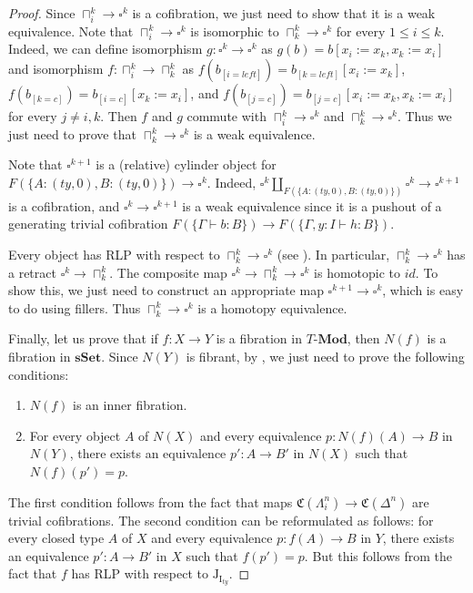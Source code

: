 \documentclass[reqno]{amsart}
\theoremstyle{definition}
\theoremstyle{remark}
\newcommand{\repl}{:=}
\newcommand{\cat}[1]{\mathbf{#1}}
\newcommand{\Mod}[1]{#1\text{-}\cat{Mod}}
\newcommand{\sSet}{\cat{sSet}}
\newcommand{\I}{\mathrm{I}}
\newcommand{\J}{\mathrm{J}}
\numberwithin{figure}{section}
\begin{document}
\begin{proof}
Since $\sqcap^k_i \to \square^k$ is a cofibration, we just need to show that it is a weak equivalence.
Note that $\sqcap^k_i \to \square^k$ is isomorphic to $\sqcap^k_k \to \square^k$ for every $1 \leq i \leq k$.
Indeed, we can define isomorphism $g : \square^k \to \square^k$ as $g(b) = b[x_i \repl x_k, x_k \repl x_i]$
and isomorphism $f : \sqcap^k_i \to \sqcap^k_k$ as $f(b_{[i=left]}) = b_{[k=left]}[x_i \repl x_k]$, $f(b_{[k=c]}) = b_{[i=c]}[x_k \repl x_i]$,
and $f(b_{[j=c]}) = b_{[j=c]}[x_i \repl x_k, x_k \repl x_i]$ for every $j \neq i,k$.
Then $f$ and $g$ commute with $\sqcap^k_i \to \square^k$ and $\sqcap^k_k \to \square^k$.
Thus we just need to prove that $\sqcap^k_k \to \square^k$ is a weak equivalence.

Note that $\square^{k+1}$ is a (relative) cylinder object for $F(\{ A : (ty,0), B : (ty,0) \}) \to \square^k$.
Indeed, $\square^k \amalg_{F(\{ A : (ty,0), B : (ty,0) \})} \square^k \to \square^{k+1}$ is a cofibration,
and $\square^k \to \square^{k+1}$ is a weak equivalence since it is a pushout of a generating trivial cofibration $F(\{ \Gamma \vdash b : B \}) \to F(\{ \Gamma, y : I \vdash h : B \})$.

Every object has RLP with respect to $\sqcap^k_k \to \square^k$ (see \cite[Section~2.4]{alg-models}).
In particular, $\sqcap^k_k \to \square^k$ has a retract $\square^k \to \sqcap^k_k$.
The composite map $\square^k \to \sqcap^k_k \to \square^k$ is homotopic to $id$.
To show this, we just need to construct an appropriate map $\square^{k+1} \to \square^k$, which is easy to do using fillers.
Thus $\sqcap^k_k \to \square^k$ is a homotopy equivalence.

Finally, let us prove that if $f : X \to Y$ is a fibration in $\Mod{T}$, then $N(f)$ is a fibration in $\sSet$.
Since $N(Y)$ is fibrant, by \cite[Corollary~2.4.6.5]{lurie-topos}, we just need to prove the following conditions:
\begin{enumerate}
\item $N(f)$ is an inner fibration.
\item For every object $A$ of $N(X)$ and every equivalence $p : N(f)(A) \to B$ in $N(Y)$, there exists an equivalence $p' : A \to B'$ in $N(X)$ such that $N(f)(p') = p$.
\end{enumerate}
The first condition follows from the fact that maps $\mathfrak{C}(\Lambda^n_i) \to \mathfrak{C}(\Delta^n)$ are trivial cofibrations.
The second condition can be reformulated as follows: for every closed type $A$ of $X$ and every equivalence $p : f(A) \to B$ in $Y$,
there exists an equivalence $p' : A \to B'$ in $X$ such that $f(p') = p$.
But this follows from the fact that $f$ has RLP with respect to $\J_{\I_{ty}}$.
\end{proof}
\end{document}
